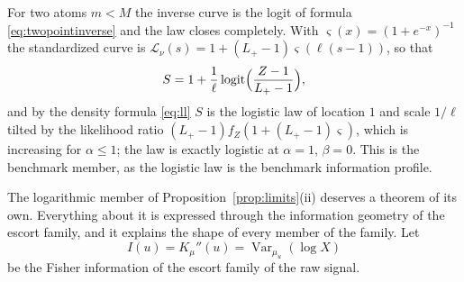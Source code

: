 \documentclass[sn-mathphys-num]{sn-jnl}\newcommand{\SNJNL}{}
\theoremstyle{thmstyleone}
\theoremstyle{thmstyletwo}
\theoremstyle{thmstylethree}
\theoremstyle{thmstyleone}
\providecommand{\Var}{\operatorname{Var}}
\providecommand{\Leh}{\mathscr{L}}
\providecommand{\logit}{\operatorname{logit}}
\begin{document}
	For two atoms $m<M$ the inverse curve is the logit of formula
	\eqref{eq:twopointinverse} and the law closes completely. With
	$\varsigma(x)=(1+e^{-x})^{-1}$ the standardized curve is
	$\Leh_\nu(s)=1+(L_+-1)\varsigma(\ell(s-1))$, so that
	\begin{equation}\label{eq:logit}
		S=1+\frac1\ell\logit\Bigl(\frac{Z-1}{L_+-1}\Bigr),
	\end{equation}
	and by the density formula \eqref{eq:ll} $S$ is the logistic law of
	location $1$ and scale $1/\ell$ tilted by the likelihood ratio
	$(L_+-1)f_Z(1+(L_+-1)\varsigma)$, which is increasing for $\alpha\le1$;
	the law is exactly logistic at $\alpha=1$, $\beta=0$. This is the
	benchmark member, as the logistic law is the benchmark information
	profile.
	
	The logarithmic member of Proposition~\ref{prop:limits}(ii)
	deserves a theorem of its own. Everything about it is expressed
	through the information geometry of the escort family, and it
	explains the shape of every member of the family. Let
	\begin{equation}\label{eq:fisherinfo}
		I(u)=K_\mu''(u)=\Var_{\mu_u}(\log X)
	\end{equation}
	be the Fisher information of the escort family of the raw signal.
	
\end{document}
